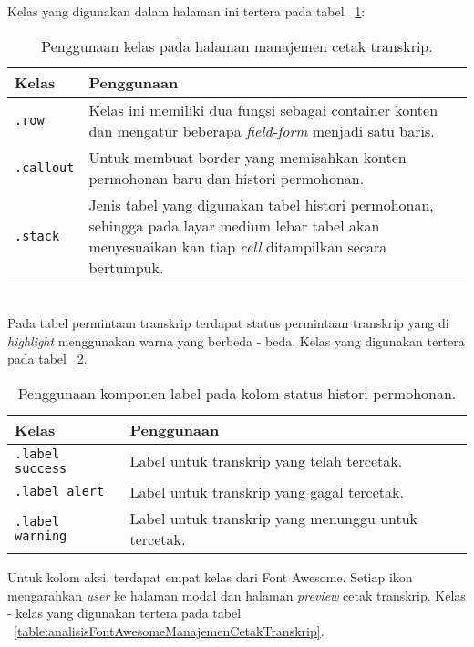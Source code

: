 Kelas yang digunakan dalam halaman ini tertera pada tabel ~\ref{table:analisisManajemenCetakTranskrip}:\\
\begin{table}[H]
	\centering
	\caption{Penggunaan kelas pada halaman manajemen cetak transkrip.}
	\begin{tabularx}{\textwidth}{lX}
		\toprule
		Kelas     & Penggunaan \\
		\midrule
		\texttt{.row} & Kelas ini memiliki dua fungsi sebagai container konten dan mengatur beberapa \textit{field-form} menjadi satu baris.\\
		\texttt{.callout} & Untuk membuat border yang memisahkan konten permohonan baru dan histori permohonan.\\
		\texttt{.stack} & Jenis tabel yang digunakan tabel histori permohonan, sehingga pada layar medium lebar tabel akan menyesuaikan kan tiap \textit{cell} ditampilkan secara bertumpuk.\\
		\bottomrule
	\end{tabularx}%
	\label{table:analisisManajemenCetakTranskrip}
\end{table} \\

\noindent Pada tabel permintaan transkrip terdapat status permintaan transkrip yang di \textit{highlight} menggunakan warna yang berbeda - beda. Kelas yang digunakan tertera pada tabel ~\ref{table:analisisLabelManajemenCetakTranskrip}.\\

\begin{table}[H]
	\centering
	\caption{Penggunaan komponen label pada kolom status histori permohonan.}
	\begin{tabularx}{\textwidth}{lX}
		\toprule
		Kelas     & Penggunaan \\
		\midrule
		\texttt{.label success} & Label untuk transkrip yang telah tercetak.\\
		\texttt{.label alert} & Label untuk transkrip yang gagal tercetak.\\
		\texttt{.label warning} & Label untuk transkrip yang menunggu untuk tercetak.\\		
		\bottomrule
	\end{tabularx}%
	\label{table:analisisLabelManajemenCetakTranskrip}
\end{table}%


\noindent Untuk kolom aksi, terdapat empat kelas dari Font Awesome. Setiap ikon mengarahkan \textit{user} ke halaman modal dan halaman \textit{preview} cetak transkrip. Kelas - kelas yang digunakan tertera pada tabel ~\ref{table:analisisFontAwesomeManajemenCetakTranskrip}.\\

